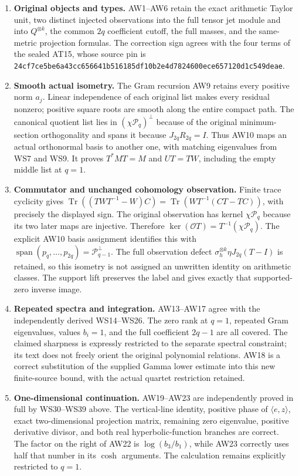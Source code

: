 \documentclass{article}
\begin{document}
\begin{enumerate}
\def\labelenumi{\arabic{enumi}.}
\tightlist
\item
  \textbf{Original objects and types.} AW1--AW6 retain the exact arithmetic Taylor unit, two distinct injected observations into the full tensor jet module and into \(Q^{\otimes k}\), the common \(2q\) coefficient cutoff, the full masses, and the same-metric projection formulas. The correction sign agrees with the four terms of the sealed AT15, whose source pin is \nolinkurl{24cf7ce5be6a43cc656641b516185df10b2e4d7824600ece657120d1c549deae}.
\item
  \textbf{Smooth actual isometry.} The Gram recursion AW9 retains every positive norm \(a_j\). Linear independence of each original list makes every residual nonzero; positive square roots are smooth along the entire compact path. The canonical quotient list lies in \((\chi\mathcal P_q)^\perp\) because of the original minimum-section orthogonality and spans it because \(J_{2q}R_{2q}=I\). Thus AW10 maps an actual orthonormal basis to another one, with matching eigenvalues from WS7 and WS9. It proves \(T^*MT=M\) and \(UT=TW\), including the empty middle list at \(q=1\).
\item
  \textbf{Commutator and unchanged cohomology observation.} Finite trace cyclicity gives \(\operatorname{Tr}((TWT^{-1}-W)C)=\operatorname{Tr}(WT^{-1}(CT-TC))\), with precisely the displayed sign. The original observation has kernel \(\chi\mathcal P_q\) because its two later maps are injective. Therefore \(\ker(\mathcal O T)=T^{-1}(\chi\mathcal P_q)\). The explicit AW10 basis assignment identifies this with \(\operatorname{span}(p_q,\ldots,p_{2q})=\mathcal P_{q-1}^{\perp}\). The full observation defect \(\sigma_h^{\otimes k}\eta J_{2q}(T-I)\) is retained, so this isometry is not assigned an unwritten identity on arithmetic classes. The support lift preserves the label and gives exactly that supported-zero inverse image.
\item
  \textbf{Repeated spectra and integration.} AW13--AW17 agree with the independently derived WS14--WS26. The zero rank at \(q=1\), repeated Gram eigenvalues, values \(b_i=1\), and the full coefficient \(2q-1\) are all covered. The claimed sharpness is expressly restricted to the separate spectral constraint; its text does not freely orient the original polynomial relations. AW18 is a correct substitution of the supplied Gamma lower estimate into this new finite-source bound, with the actual quartet restriction retained.
\item
  \textbf{One-dimensional continuation.} AW19--AW23 are independently proved in full by WS30--WS39 above. The vertical-line identity, positive phase of \(\langle e,z\rangle\), exact two-dimensional projection matrix, remaining zero eigenvalue, positive derivative divisor, and both real hyperbolic-function branches are correct. The factor on the right of AW22 is \(\log(b_3/b_1)\), while AW23 correctly uses half that number in its \(\cosh\) arguments. The calculation remains explicitly restricted to \(q=1\).
\end{enumerate}
\end{document}
